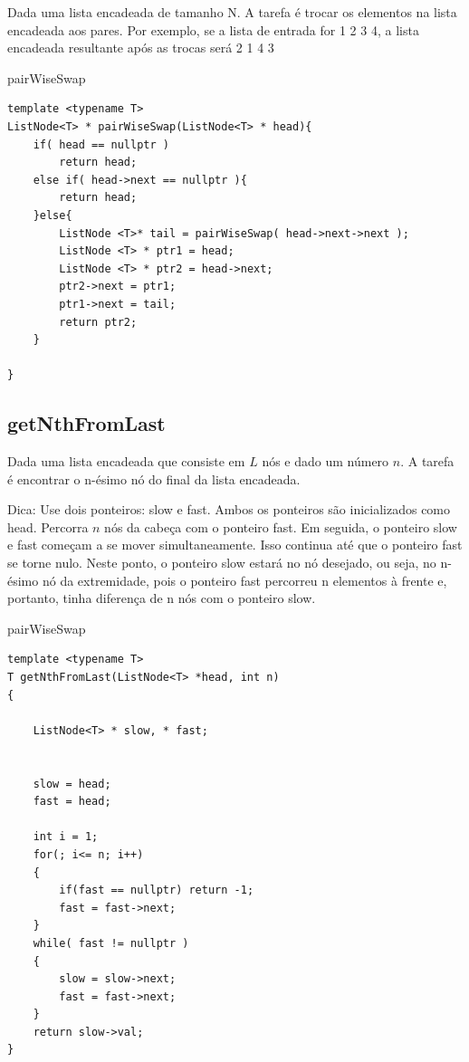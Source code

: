 Dada uma lista encadeada de tamanho N. A tarefa é trocar os elementos na lista encadeada aos pares.
Por exemplo, se a lista de entrada for 1 2 3 4, a lista encadeada resultante após as trocas será 2 1 4 3

\begin{listing}[!ht]
\caption{pairWiseSwap}
\begin{verbatim}
template <typename T>
ListNode<T> * pairWiseSwap(ListNode<T> * head){
    if( head == nullptr ) 
        return head;
    else if( head->next == nullptr ){
        return head;
    }else{
        ListNode <T>* tail = pairWiseSwap( head->next->next );
        ListNode <T> * ptr1 = head;
        ListNode <T> * ptr2 = head->next;
        ptr2->next = ptr1;
        ptr1->next = tail;
        return ptr2;
    }

}
\end{verbatim}
\end{listing}

\subsection{getNthFromLast}


Dada uma lista encadeada que consiste em $L$ nós e dado um número $n$. A tarefa é encontrar o n-ésimo nó do final da lista encadeada.


Dica: Use dois ponteiros: slow e fast. Ambos os ponteiros são inicializados como head. Percorra $n$ nós da cabeça com o  ponteiro fast. Em seguida, o ponteiro slow e fast começam a se mover simultaneamente. Isso continua até que o ponteiro fast se torne nulo. Neste ponto, o ponteiro slow estará no nó desejado, ou seja, no n-ésimo nó da extremidade, pois o ponteiro fast percorreu n elementos à frente e, portanto, tinha diferença de n nós com o ponteiro slow.
\begin{listing}[!ht]
\caption{pairWiseSwap}

\begin{verbatim}
template <typename T>
T getNthFromLast(ListNode<T> *head, int n)
{
    
    ListNode<T> * slow, * fast;
    
    
    slow = head;
    fast = head;
    
    int i = 1;
    for(; i<= n; i++)
    {
        if(fast == nullptr) return -1;
        fast = fast->next;    
    }
    while( fast != nullptr )
    {
        slow = slow->next;
        fast = fast->next;
    }
    return slow->val;
}

\end{verbatim}
\end{listing}

